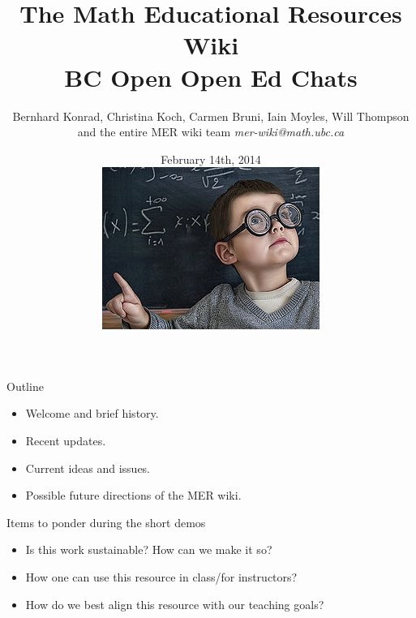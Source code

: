 \documentclass{beamer}
\title[The Math Exam Resource Wiki]{The Math \xcancel{Exam} Educational Resources Wiki \\ BC Open Open Ed Chats}
\author{Bernhard Konrad, Christina Koch, Carmen Bruni, Iain Moyles, Will Thompson and the entire MER wiki team
\newline
\small \it mer-wiki@math.ubc.ca}
\institute{The University of British Columbia}
\date{February 14th, 2014 \\
\includegraphics[scale=0.4]{David_Webster.jpg}
}
\begin{document}
\frame{\titlepage}






\frame
{
  \begin{block}{Outline}

      \begin{itemize}
				\item Welcome and brief history.
                \item Recent updates.
				\item Current ideas and issues.
				\item Possible future directions of the MER wiki.
      \end{itemize}
  \end{block}

  \begin{block}{Items to ponder during the short demos}

      \begin{itemize}
				\item Is this work sustainable? How can we make it so?
				\item How one can use this resource in class/for instructors?
                \item How do we best align this resource with our teaching goals?
      \end{itemize}
  \end{block}

}
\end{document}
